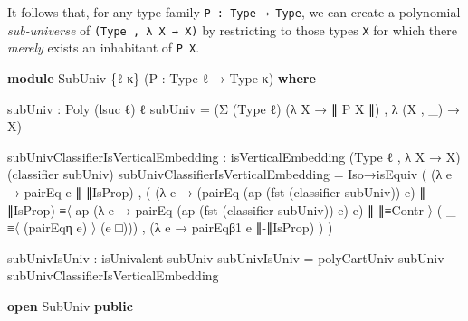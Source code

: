 \documentclass[
  11pt,
  oneside,
  article]{memoir}
\newenvironment{Shaded}{}{}
\newcommand{\KeywordTok}[1]{\textcolor[rgb]{0.00,0.44,0.13}{\textbf{#1}}}
\newcommand{\NormalTok}[1]{#1}
\newcommand{\OtherTok}[1]{\textcolor[rgb]{0.00,0.44,0.13}{#1}}
\theoremstyle{definition}
\theoremstyle{plain}
\newcommand{\0}{\textsf{0}}
\newcommand{\1}{\tn{\textsf{1}}}
\begin{document}
It follows that, for any type family \texttt{P\ :\ Type\ →\ Type}, we
can create a polynomial \emph{sub-universe} of
\texttt{(Type\ ,\ λ\ X\ →\ X)} by restricting to those types \texttt{X}
for which there \emph{merely} exists an inhabitant of \texttt{P\ X}.

\begin{Shaded}
\begin{Highlighting}[]
\KeywordTok{module}\NormalTok{ SubUniv }\OtherTok{\{}\NormalTok{ℓ κ}\OtherTok{\}} \OtherTok{(}\NormalTok{P }\OtherTok{:}\NormalTok{ Type ℓ }\OtherTok{→}\NormalTok{ Type κ}\OtherTok{)} \KeywordTok{where}

\NormalTok{    subUniv }\OtherTok{:}\NormalTok{ Poly }\OtherTok{(}\NormalTok{lsuc ℓ}\OtherTok{)}\NormalTok{ ℓ}
\NormalTok{    subUniv }\OtherTok{=} \OtherTok{(}\NormalTok{Σ }\OtherTok{(}\NormalTok{Type ℓ}\OtherTok{)} \OtherTok{(λ}\NormalTok{ X }\OtherTok{→}\NormalTok{ ∥ P X ∥}\OtherTok{)}\NormalTok{ , }\OtherTok{λ} \OtherTok{(}\NormalTok{X , }\OtherTok{\_)} \OtherTok{→}\NormalTok{ X}\OtherTok{)}

\NormalTok{    subUnivClassifierIsVerticalEmbedding }\OtherTok{:}
\NormalTok{        isVerticalEmbedding }\OtherTok{(}\NormalTok{Type ℓ , }\OtherTok{λ}\NormalTok{ X }\OtherTok{→}\NormalTok{ X}\OtherTok{)} \OtherTok{(}\NormalTok{classifier subUniv}\OtherTok{)}
\NormalTok{    subUnivClassifierIsVerticalEmbedding }\OtherTok{=} 
\NormalTok{        Iso→isEquiv }\OtherTok{(} \OtherTok{(λ}\NormalTok{ e }\OtherTok{→}\NormalTok{ pairEq e ∥{-}∥IsProp}\OtherTok{)} 
\NormalTok{                    , }\OtherTok{(} \OtherTok{(λ}\NormalTok{ e }\OtherTok{→} \OtherTok{(}\NormalTok{pairEq }\OtherTok{(}\NormalTok{ap }\OtherTok{(}\NormalTok{fst }\OtherTok{(}\NormalTok{classifier subUniv}\OtherTok{))}\NormalTok{ e}\OtherTok{)}\NormalTok{ ∥{-}∥IsProp}\OtherTok{)} 
\NormalTok{                               ≡〈 ap }\OtherTok{(λ}\NormalTok{ e\textquotesingle{} }\OtherTok{→}\NormalTok{ pairEq }\OtherTok{(}\NormalTok{ap }\OtherTok{(}\NormalTok{fst }\OtherTok{(}\NormalTok{classifier subUniv}\OtherTok{))}\NormalTok{ e}\OtherTok{)}\NormalTok{ e\textquotesingle{}}\OtherTok{)}\NormalTok{ ∥{-}∥≡Contr 〉 }
                               \OtherTok{(} \OtherTok{\_} 
\NormalTok{                               ≡〈 }\OtherTok{(}\NormalTok{pairEqη e}\OtherTok{)}\NormalTok{ 〉 }
                               \OtherTok{(}\NormalTok{e □}\OtherTok{)))} 
\NormalTok{                      , }\OtherTok{(λ}\NormalTok{ e }\OtherTok{→}\NormalTok{ pairEqβ1 e ∥{-}∥IsProp}\OtherTok{)} \OtherTok{)} \OtherTok{)}
    
\NormalTok{    subUnivIsUniv }\OtherTok{:}\NormalTok{ isUnivalent subUniv}
\NormalTok{    subUnivIsUniv }\OtherTok{=}\NormalTok{ polyCartUniv subUniv subUnivClassifierIsVerticalEmbedding}

\KeywordTok{open}\NormalTok{ SubUniv }\KeywordTok{public}
\end{Highlighting}
\end{Shaded}
\end{document}
